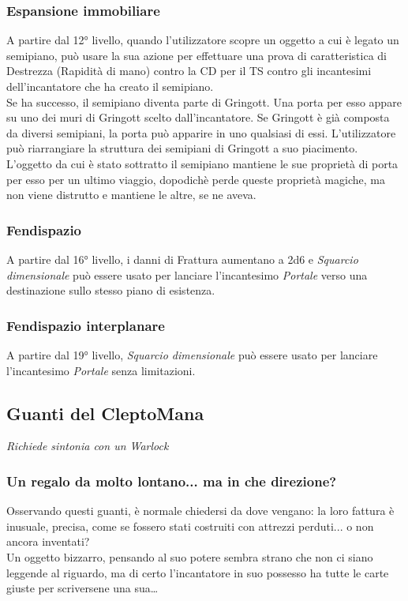 \subsubsection{Espansione immobiliare}
A partire dal 12° livello, quando l'utilizzatore scopre un oggetto a cui è legato un semipiano, può usare la sua azione per effettuare una prova di caratteristica di Destrezza (Rapidità di mano) contro la CD per il TS contro gli incantesimi dell'incantatore che ha creato il semipiano.\\
Se ha successo, il semipiano diventa parte di Gringott. Una porta per esso appare su uno dei muri di Gringott scelto dall'incantatore. Se Gringott è già composta da diversi semipiani, la porta può apparire in uno qualsiasi di essi. L'utilizzatore può riarrangiare la struttura dei semipiani di Gringott a suo piacimento.\\
L'oggetto da cui è stato sottratto il semipiano mantiene le sue proprietà di porta per esso per un ultimo viaggio, dopodichè perde queste proprietà magiche, ma non viene distrutto e mantiene le altre, se ne aveva.

\subsubsection{Fendispazio}
A partire dal 16° livello, i danni di Frattura aumentano a 2d6 e \textit{Squarcio dimensionale} può essere usato per lanciare l'incantesimo \textit{Portale} verso una destinazione sullo stesso piano di esistenza.

\subsubsection{Fendispazio interplanare}
A partire dal 19° livello, \textit{Squarcio dimensionale} può essere usato per lanciare l'incantesimo \textit{Portale} senza limitazioni.

\subsection{Guanti del CleptoMana}
\textit{Richiede sintonia con un Warlock} 

\subsubsection{Un regalo da molto lontano... ma in che direzione?}
Osservando questi guanti, è normale chiedersi da dove vengano: la loro fattura è inusuale, precisa, come se fossero stati costruiti con attrezzi perduti... o non ancora inventati? \\
Un oggetto bizzarro, pensando al suo potere sembra strano che non ci siano leggende al riguardo, ma di certo l'incantatore in suo possesso ha tutte le carte giuste per scriversene una sua…

